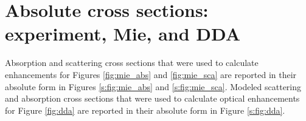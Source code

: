 \documentclass[12pt]{article}
\begin{document}
\section{Absolute cross sections: experiment, Mie, and DDA}



Absorption and scattering cross sections that were used to calculate enhancements for Figures \ref{fig:mie_abs} and \ref{fig:mie_sca} are reported in their absolute form in Figures \ref{s:fig:mie_abs} and \ref{s:fig:mie_sca}. Modeled scattering and absorption cross sections that were used to calculate optical enhancements for Figure \ref{fig:dda} are reported in their absolute form in Figure \ref{s:fig:dda}.
\end{document}
